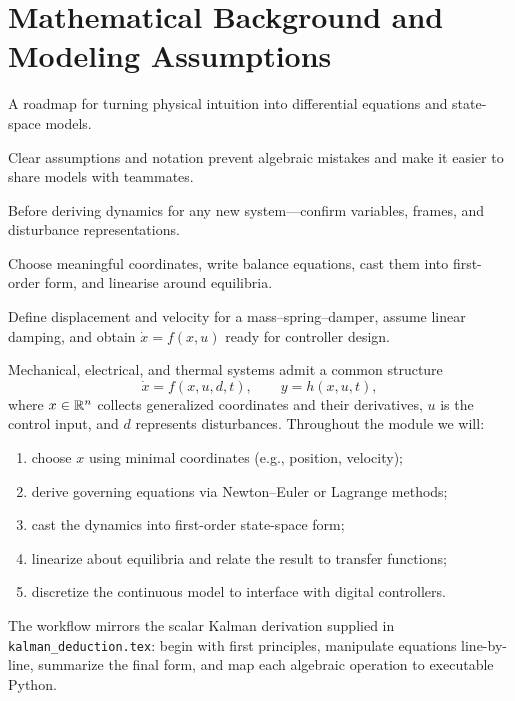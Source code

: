 \section{Mathematical Background and Modeling Assumptions}
\begin{beginnerguide}
    \item[\textbf{What?}] A roadmap for turning physical intuition into differential equations and state-space models.
    \item[\textbf{Why?}] Clear assumptions and notation prevent algebraic mistakes and make it easier to share models with teammates.
    \item[\textbf{When?}] Before deriving dynamics for any new system—confirm variables, frames, and disturbance representations.
    \item[\textbf{How?}] Choose meaningful coordinates, write balance equations, cast them into first-order form, and linearise around equilibria.
    \item[\textbf{Example}] Define displacement and velocity for a mass--spring--damper, assume linear damping, and obtain $\dot{x} = f(x,u)$ ready for controller design.
\end{beginnerguide}
Mechanical, electrical, and thermal systems admit a common structure
\[
    \dot{x} = f(x, u, d, t), \qquad y = h(x, u, t),
\]
where $x \in \mathbb{R}^n$ collects generalized coordinates and their derivatives, $u$ is the control input, and $d$ represents disturbances. Throughout the module we will:
\begin{enumerate}[leftmargin=*]
    \item choose $x$ using minimal coordinates (e.g., position, velocity);
    \item derive governing equations via Newton--Euler or Lagrange methods;
    \item cast the dynamics into first-order state-space form;
    \item linearize about equilibria and relate the result to transfer functions;
    \item discretize the continuous model to interface with digital controllers.
\end{enumerate}
The workflow mirrors the scalar Kalman derivation supplied in \texttt{kalman\_deduction.tex}: begin with first principles, manipulate equations line-by-line, summarize the final form, and map each algebraic operation to executable Python.

